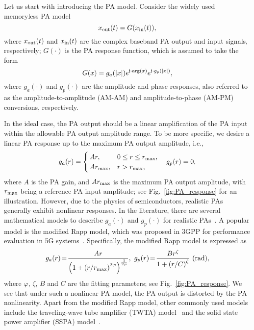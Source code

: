 \documentclass[10pt,twocolumn,twoside]{IEEEtran}
\begin{document}
Let us start with introducing the PA model.
Consider the widely used memoryless PA model~\cite{schreurs2008rf,ochiai2013analysis}
\begin{equation}\label{eq:PA_general}
	x_{\rm out}(t) = G(x_{\rm in}(t)),
\end{equation}
where
$x_{\rm out}(t)$ and $x_{\rm in}(t)$  are the  complex baseband  PA output and input  signals, respectively;
$G(\cdot)$ is the PA response function, which is assumed to take the form
\[
G(x) = g_a(|x|) e^{{\mathfrak j} \cdot {\rm arg}(x)} e^{{\mathfrak j} \cdot g_p(|x|)},
\]
where $g_a(\cdot)$ and $g_p(\cdot)$ are the amplitude and phase responses, also referred to as
the amplitude-to-amplitude (AM-AM) and amplitude-to-phase (AM-PM) conversions, respectively.


In the ideal case, the PA output should be
a linear amplification of the PA input within the allowable PA output amplitude range.
To be more specific, we desire a linear PA response up to the maximum PA output amplitude, i.e.,
\begin{equation}\label{eq:ideal_pa}
	g_a(r) =
	\begin{cases}
		Ar, & 0 \le r \le r_{\rm max},\\
		Ar_{\rm max}, & r > r_{\rm max},
	\end{cases}
	\quad
	g_p(r) = 0,
\end{equation}
where $A$ is the PA gain, and $Ar_{\rm max}$ is the maximum PA output amplitude, with $r_{\rm max}$ being a reference PA input amplitude;
see Fig.~\ref{fig:PA_response} for an illustration.
However, due to the physics of semiconductors, realistic PAs generally exhibit nonlinear responses.
In the literature, there are several mathematical models to describe $g_a(\cdot)$ and $g_p(\cdot)$ for realistic PAs~\cite{schreurs2008rf,ochiai2013analysis,3gpp_pa,saleh1981frequency,rapp1991effects}.
A popular model is the modified Rapp model, which was proposed in 3GPP
for performance evaluation in 5G systems~\cite{3gpp_pa}.
Specifically, the modified Rapp model is expressed as
\begin{equation}\label{eq:rapp}
	g_a(r) \!= \!\frac{Ar}{\left( 1+\left( r/r_{\rm max} \right)^{2\varphi} \right)^{\frac{1}{2\varphi}}}, ~
	g_p(r) \!= \! \frac{B  r^\zeta}{1+\left({r}/{C}\right)^\zeta}~ ({\rm rad}),
\end{equation}
where $\varphi$, $\zeta$, $B$ and $C$ are the fitting parameters;
see Fig.~\ref{fig:PA_response}.
We see that under such a nonlinear PA model, the PA output is distorted by the PA nonlinearity.
Apart from the modified Rapp model,  other commonly used models include the traveling-wave tube amplifier (TWTA) model~\cite{saleh1981frequency} and the solid state power amplifier (SSPA) model~\cite{rapp1991effects}.
\end{document}
